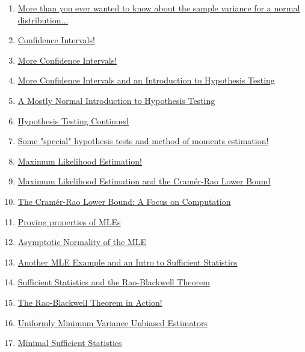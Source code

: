 \documentclass[11pt]{article}
\begin{document}
\begin{enumerate}
	\item \href{https://mp.weixin.qq.com/s/Z59Ku23j8rVLlFATkIRUDQ}{More than you ever wanted to know about the sample variance for a normal distribution...}	%
	\item \href{https://mp.weixin.qq.com/s/tBi3zoJSnh30_dzmFlor9w}{Confidence Intervals!}	%
	\item \href{https://mp.weixin.qq.com/s/s-QVu6dwdMsrPJZMr8jwYQ}{More Confidence Intervals!}	%
	\item \href{https://mp.weixin.qq.com/s/IybUV5Txg3zkB86Pdp6jlQ}{More Confidence Intervals and an Introduction to Hypothesis Testing}	%
	\item \href{https://mp.weixin.qq.com/s/F155SYm8ObEiTJSsY4nPBg}{A Mostly Normal Introduction to Hypothesis Testing}	%
	\item \href{https://mp.weixin.qq.com/s/JSP_SiTwIbKsdZx8eJVo9A}{Hypothesis Testing Continued}	%
	\item \href{https://mp.weixin.qq.com/s/CubnjQ0DNHnFq-xYXWSHHA}{Some "special" hypothesis tests and method of moments estimation!}	%
	\item \href{https://mp.weixin.qq.com/s/TXG0dUlHQ18Im8QUibPR4g}{Maximum Likelihood Estimation!}	%
	\item \href{https://mp.weixin.qq.com/s/lF-9cFda_tVRqcBoCdcqyQ}{Maximum Likelihood Estimation and the Cram{\'e}r-Rao Lower Bound}	%
	\item \href{https://mp.weixin.qq.com/s/iGxDc2rsVaEyIBxt03YNDw}{The Cram{\'e}r-Rao Lower Bound: A Focus on Computation}	%
	\item \href{https://mp.weixin.qq.com/s/wDR5IbHgIwgAHwwKG6lHkw}{Proving properties of MLEs}	%
	\item \href{https://mp.weixin.qq.com/s/Jvr-vPWGq6183zAKCGq4bA}{Asymptotic Normality of the MLE}	%
	\item \href{https://mp.weixin.qq.com/s/qiqF-ovY51FOCp71YRu_LA}{Another MLE Example and an Intro to Sufficient Statistics}	%
	\item \href{https://mp.weixin.qq.com/s/Xim_24fZYPky9UbUDKh2lQ}{Sufficient Statistics and the Rao-Blackwell Theorem}	%
	\item \href{https://mp.weixin.qq.com/s/0xcTrlS8psbArsYe-1mzJw}{The Rao-Blackwell Theorem in Action!}	%
	\item \href{https://mp.weixin.qq.com/s/DVoKc8_jtER5K3-XfmDJiA}{Uniformly Minimum Variance Unbiased Estimators}	%
	\item \href{https://mp.weixin.qq.com/s/dnFFDkdtBCCxHmkXs_5G8A}{Minimal Sufficient Statistics}	%

\end{enumerate}
\end{document}
